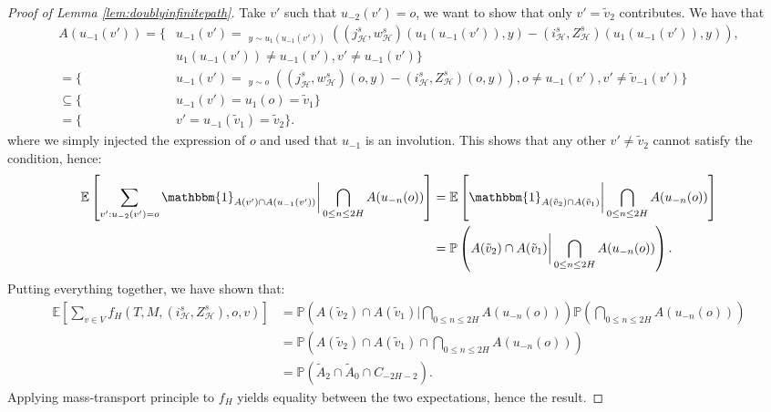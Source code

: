 \documentclass[11pt]{article}
\DeclareMathOperator{\lex}{lex}
\DeclareMathOperator*{\argmax}{argmax}
\DeclareMathOperator*{\argmaxxlex}{\overset{[2],\lex}{\argmax}}
\begin{document}
\begin{proof}[Proof of Lemma \ref{lem:doublyinfinitepath}]
    Take $v'$ such that $u_{-2}(v')=o$, we want to show that only $v'=\tilde{v}_2$ contributes. We have that 
    \begin{align*}
    A(u_{-1}(v'))=\bigg\{&u_{-1}(v')=\argmaxxlex_{y \sim u_{1}(u_{-1}(v'))}((j_{\mathcal{H}}^s,w_{\mathcal{H}}^s)(u_{1}(u_{-1}(v')),y)-(i^s_{\mathcal{H}},Z^s_{\mathcal{H}})(u_{1}(u_{-1}(v')),y)),\\
    &u_{1}(u_{-1}(v')) \neq u_{-1}(v'), v' \neq u_{-1}(v') \bigg\} \\
    =\bigg\{&u_{-1}(v')=\argmaxxlex_{y \sim o}((j_{\mathcal{H}}^s,w_{\mathcal{H}}^s)(o,y)-(i^s_{\mathcal{H}},Z^s_{\mathcal{H}})(o,y)), o \neq u_{-1}(v') ,v'\neq \tilde{v}_{-1}(v') \bigg\} \\
    \subseteq\bigg\{&u_{-1}(v')=u_1(o)=\tilde{v}_1  \bigg\} \\
    =\bigg\{&v'=u_{-1}(\tilde{v}_1)=\tilde{v}_2\bigg\}.
    \end{align*}
    where we simply injected the expression of $o$ and used that $u_{-1}$ is an involution.
    This shows that any other $v'\neq \tilde{v}_2$ cannot satisfy the condition, hence:
    \begin{align*}
    \mathbb{E}\left[ \sum_{v': u_{-2}(v')=o} \mathbbm{1}_{ A(v') \cap A(u_{-1}(v')) } \bigg| \bigcap_{0 \leq n \leq 2H} A(u_{-n}( o)) \right] 
    &= \mathbb{E} \left[    \mathbbm{1}_{ A(\tilde{v}_2) \cap A(\tilde{v}_1) } \bigg| \bigcap_{0 \leq n \leq 2H} A(u_{-n}( o))     \right] \\
    &= \mathbb{P} \left( A(\tilde{v}_2)\cap A(\tilde{v}_1) \bigg|  \bigcap_{0 \leq n \leq 2H} A(u_{-n}( o))      \right).
    \end{align*}
    Putting everything together, we have shown that:
    \begin{align*}
    \mathbb{E}\left[\sum_{v \in V}f_{H}(T,M,(i^s_{\mathcal{H}},Z^s_{\mathcal{H}}),o,v)\right] &=\mathbb{P} \left( A(\tilde{v}_2)\cap A(\tilde{v}_1) \bigg|  \bigcap_{0 \leq n \leq 2H} A(u_{-n}( o))      \right)\mathbb{P} \left(   \bigcap_{0 \leq n \leq 2H} A(u_{-n}( o)) \right) \\
    &=\mathbb{P} \left( A(\tilde{v}_2)\cap A(\tilde{v}_1) \cap  \bigcap_{0 \leq n \leq 2H} A(u_{-n}( o))      \right) \\
    &= \mathbb{P}( \tilde{A}_2 \cap \tilde{A}_0 \cap C_{-2H-2}).
    \end{align*}
    Applying mass-transport principle to $f_{H}$ yields equality between the two expectations, hence the result.
\end{proof}
\end{document}
